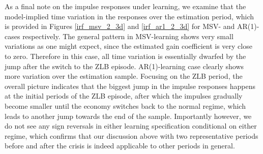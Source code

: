 \documentclass[12pt,reqno]{article}
\numberwithin{equation}{section}
\begin{document}
\noindent
As a final note on the impulse responses under learning, we examine that the model-implied time variation in the responses over the estimation period, which is provided in Figures \ref{irf_msv_2_3d} and \ref{irf_ar1_2_3d} for MSV- and AR(1)-cases respectively. The general pattern in MSV-learning shows very small variations as one might expect, since the estimated gain coefficient is very close to zero. Therefore in this case, all time variation is essentially dwarfed by the jump after the switch to the ZLB episode. AR(1)-learning case clearly shows more variation over the estimation sample. Focusing on the ZLB period, the overall picture indicates that the biggest jump in the impulse responses happens at the initial periods of the ZLB episode, after which the impulses gradually become smaller until the economy switches back to the normal regime, which leads to another jump towards the end of the sample. Importantly however, we do not see any sign reversals in either learning specification conditional on either regime, which confirms that our discussion above with two representative periods before and after the crisis is indeed applicable to other periods in general. 








\end{document}
